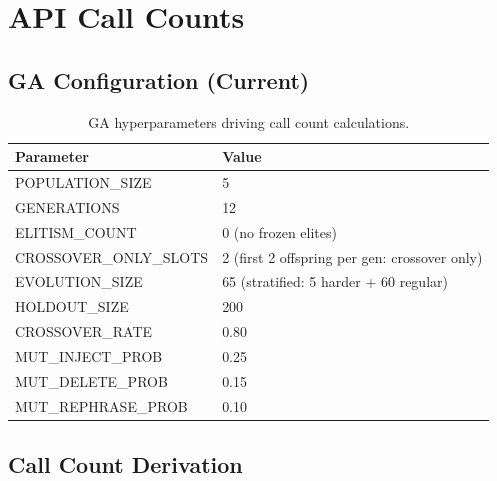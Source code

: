 \documentclass[11pt,a4paper]{report}
\begin{document}
\chapter{API Call Counts}

\section{GA Configuration (Current)}

\begin{table}[h]
\centering
\begin{tabular}{@{}ll@{}}
\toprule
\textbf{Parameter} & \textbf{Value} \\
\midrule
POPULATION\_SIZE      & 5 \\
GENERATIONS           & 12 \\
ELITISM\_COUNT        & 0 (no frozen elites) \\
CROSSOVER\_ONLY\_SLOTS & 2 (first 2 offspring per gen: crossover only) \\
EVOLUTION\_SIZE       & 65 (stratified: 5 harder + 60 regular) \\
HOLDOUT\_SIZE         & 200 \\
CROSSOVER\_RATE       & 0.80 \\
MUT\_INJECT\_PROB     & 0.25 \\
MUT\_DELETE\_PROB     & 0.15 \\
MUT\_REPHRASE\_PROB   & 0.10 \\
\bottomrule
\end{tabular}
\caption{GA hyperparameters driving call count calculations.}
\end{table}

\section{Call Count Derivation}
\end{document}
